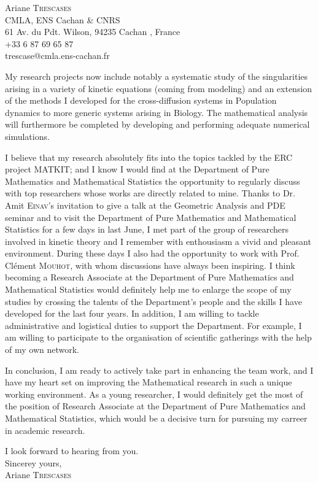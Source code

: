 \documentclass[11pt]{letter}
\begin{document}
\begin{letter}{Ariane \textsc{Trescases}\\
CMLA, ENS Cachan \& CNRS\\
61 Av. du Pdt. Wilson, 94235 Cachan , France\\
+33 6 87 69 65 87\\
{\ttfamily trescase@cmla.ens-cachan.fr}}
\vspace{0.4cm}

\quad My research projects now include notably a systematic study of the singularities arising in a variety of kinetic equations (coming from modeling) and an extension of the methods I developed for the cross-diffusion systems in Population dynamics to more generic systems arising in Biology. The mathematical analysis will furthermore be completed by developing and performing adequate numerical simulations.
 
\vspace{0.4cm}

\quad I believe that my research absolutely fits into the topics tackled by the ERC project MATKIT; and I know I would find at the Department of Pure Mathematics and Mathematical Statistics the opportunity to regularly discuss with top researchers whose works are directly related to mine. Thanks to Dr. Amit \textsc{Einav}'s invitation to give a talk at the Geometric Analysis and PDE seminar and to visit the Department of Pure Mathematics and Mathematical Statistics for a few days in last June, I met part of the group of researchers involved in kinetic theory and I remember with enthousiasm a vivid and pleasant environment. During these days I also had the opportunity to work with Prof. Cl\'ement \textsc{Mouhot}, with whom discussions have always been inspiring. I think becoming a Research Associate at the Department of Pure Mathematics and Mathematical Statistics would definitely help me to enlarge the scope of my studies by crossing the talents of the Department's people and the skills I have developed for the last four years. In addition, I am willing to tackle administrative and logistical duties to support the Department. For example, I am willing to participate to the organisation of scientific gatherings with the help of my own network.

\vspace{0.4cm}

\quad In conclusion, I am ready to actively take part in enhancing the team work, and I have my heart set on improving the Mathematical research in such a unique working environment. As a young researcher, I would definitely get the most of the position of Research Associate at the Department of Pure Mathematics and Mathematical Statistics, which would be a decisive turn for pursuing my carreer in academic research.


\vspace{0.8cm}

I look forward to hearing from you.\\
Sincerey yours,\\
Ariane \textsc{Trescases}

\end{letter}
\end{document}
